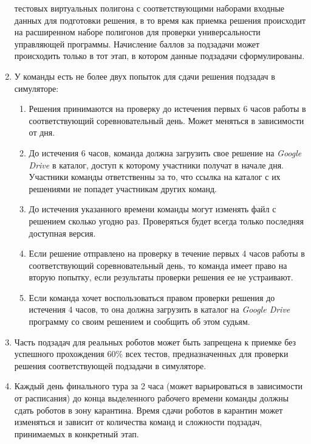 \begin{enumerate}
            тестовых виртуальных полигона с соответствующими наборами входные данных для подготовки
            решения, в то время как приемка решения происходит на расширенном наборе полигонов для
            проверки универсальности управляющей программы. Начисление баллов за подзадачи может
            происходить только в тот этап, в котором данные подзадачи сформулированы.
    \item У команды есть не более двух попыток для сдачи решения подзадач в симуляторе:
    \begin{enumerate}
        \item Решения принимаются на проверку до истечения первых 6 часов работы в
                соответствующий соревновательный день. Может меняться в зависимости от дня.
        \item До истечения 6 часов, команда должна загрузить свое решение на \textit{Google Drive}
                в каталог, доступ к которому участники получат в начале дня.
                Участники команды ответственны за то, что ссылка на каталог с их решениями не
                попадет участникам других команд.
        \item До истечения указанного времени команды могут изменять файл с решением
                сколько угодно раз. Проверяться будет всегда только последняя доступная версия.
        \item Если решение отправлено на проверку в течение первых 4 часов работы
                в соответствующий соревновательный день, то команда имеет право на вторую попытку,
                если результаты проверки решения ее не устраивают.
        \item Если команда хочет воспользоваться правом проверки решения до истечения
                4 часов, то она должна загрузить в каталог на \textit{Google Drive} программу со своим
                решением и сообщить об этом судьям.
    \end{enumerate}
    \item Часть подзадач для реальных роботов может быть запрещена к приемке без успешного прохождения $60\%$ всех тестов,
        предназначенных для проверки решения соответствующей подзадачи в симуляторе.
    \item Каждый день финального тура за 2 часа (может варьироваться в зависимости от расписания) до конца выделенного
            рабочего времени команды должны сдать роботов в зону карантина. Время сдачи роботов в карантин может изменяться
            и зависит от количества команд и сложности подзадач, принимаемых в конкретный этап.

\end{enumerate}
